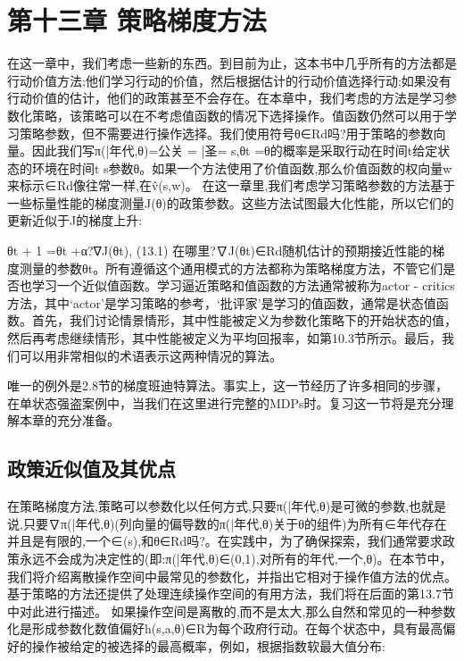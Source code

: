\chapter{第十三章 策略梯度方法}
\begin{summary}
	在这一章中，我们考虑一些新的东西。到目前为止，这本书中几乎所有的方法都是行动价值方法;他们学习行动的价值，然后根据估计的行动价值选择行动;如果没有行动价值的估计，他们的政策甚至不会存在。在本章中，我们考虑的方法是学习参数化策略，该策略可以在不考虑值函数的情况下选择操作。值函数仍然可以用于学习策略参数，但不需要进行操作选择。我们使用符号θ∈Rd吗?用于策略的参数向量。因此我们写π(|年代,θ)=公关{ = |圣= s,θt =θ}的概率是采取行动在时间t给定状态的环境在时间t s参数θ。如果一个方法使用了价值函数,那么价值函数的权向量w来标示∈Rd像往常一样,在v̂(s,w)。
	在这一章里,我们考虑学习策略参数的方法基于一些标量性能的梯度测量J(θ)的政策参数。这些方法试图最大化性能，所以它们的更新近似于J的梯度上升:
	
	θt + 1 =θt +α?∇J(θt), 					(13.1)
	在哪里?∇J(θt)∈Rd随机估计的预期接近性能的梯度测量的参数θt。所有遵循这个通用模式的方法都称为策略梯度方法，不管它们是否也学习一个近似值函数。学习逼近策略和值函数的方法通常被称为actor - critics方法，其中‘actor’是学习策略的参考，‘批评家’是学习的值函数，通常是状态值函数。首先，我们讨论情景情形，其中性能被定义为参数化策略下的开始状态的值，然后再考虑继续情形，其中性能被定义为平均回报率，如第10.3节所示。最后，我们可以用非常相似的术语表示这两种情况的算法。
	
	唯一的例外是2.8节的梯度班迪特算法。事实上，这一节经历了许多相同的步骤，在单状态强盗案例中，当我们在这里进行完整的MDPs时。复习这一节将是充分理解本章的充分准备。
\end{summary}

\section{政策近似值及其优点}
在策略梯度方法,策略可以参数化以任何方式,只要π(|年代,θ)是可微的参数,也就是说,只要∇π(|年代,θ)(列向量的偏导数的π(|年代,θ)关于θ的组件)为所有∈年代存在并且是有限的,一个∈(s),和θ∈Rd吗?。在实践中，为了确保探索，我们通常要求政策永远不会成为决定性的(即:π(|年代,θ)∈(0,1),对所有的年代,一个,θ)。在本节中，我们将介绍离散操作空间中最常见的参数化，并指出它相对于操作值方法的优点。基于策略的方法还提供了处理连续操作空间的有用方法，我们将在后面的第13.7节中对此进行描述。
如果操作空间是离散的,而不是太大,那么自然和常见的一种参数化是形成参数化数值偏好h(s,a,θ)∈R为每个政府行动。在每个状态中，具有最高偏好的操作被给定的被选择的最高概率，例如，根据指数软最大值分布:
 
